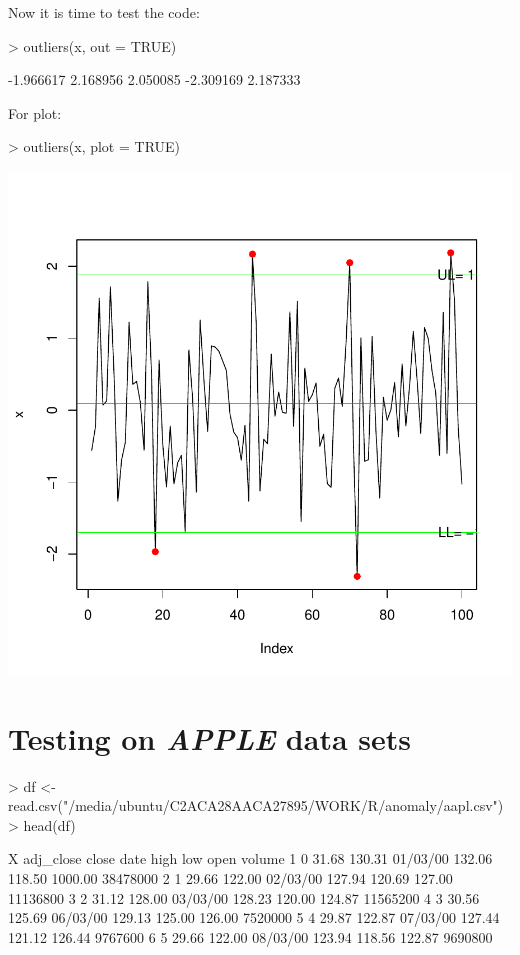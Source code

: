 \documentclass{article}
\begin{document}
Now it is time to test the code:

\begin{Schunk}
\begin{Sinput}
> outliers(x, out = TRUE)
\end{Sinput}
\begin{Soutput}
[1] -1.966617  2.168956  2.050085 -2.309169  2.187333
\end{Soutput}
\end{Schunk}

For plot:

\begin{Schunk}
\begin{Sinput}
> outliers(x, plot = TRUE)
\end{Sinput}
\end{Schunk}
\includegraphics{anadetect-007}

\section{Testing on \emph{APPLE} data sets}


\begin{Schunk}
\begin{Sinput}
> df <- read.csv("/media/ubuntu/C2ACA28AACA27895/WORK/R/anomaly/aapl.csv")
> head(df)
\end{Sinput}
\begin{Soutput}
  X adj_close  close     date   high    low    open   volume
1 0     31.68 130.31 01/03/00 132.06 118.50 1000.00 38478000
2 1     29.66 122.00 02/03/00 127.94 120.69  127.00 11136800
3 2     31.12 128.00 03/03/00 128.23 120.00  124.87 11565200
4 3     30.56 125.69 06/03/00 129.13 125.00  126.00  7520000
5 4     29.87 122.87 07/03/00 127.44 121.12  126.44  9767600
6 5     29.66 122.00 08/03/00 123.94 118.56  122.87  9690800
\end{Soutput}
\end{Schunk}
\end{document}
